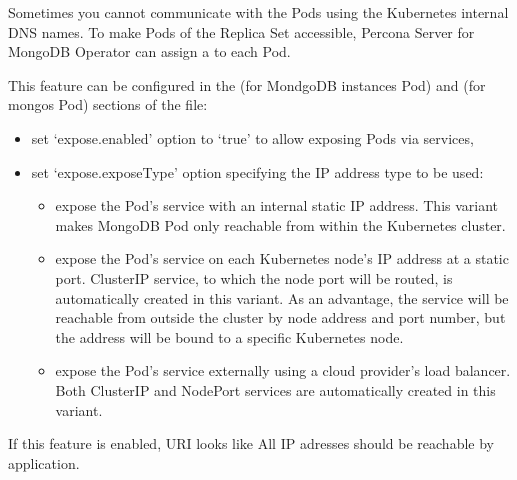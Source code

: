 \documentclass[letterpaper,10pt,english]{sphinxmanual}
\begin{document}
Sometimes you cannot communicate with the Pods using the Kubernetes internal DNS
names. To make Pods of the Replica Set accessible, Percona Server for
MongoDB Operator can assign a 
to each Pod.

This feature can be configured in the  (for MondgoDB instances Pod)
and  (for mongos Pod) sections of the
file:
\begin{itemize}
\item {} 
set ‘expose.enabled’ option to ‘true’ to allow exposing Pods via
services,

\item {} 
set ‘expose.exposeType’ option specifying the IP address type to be
used:
\begin{itemize}
\item {} 
 \sphinxhyphen{} expose the Pod’s service with an internal static
IP address. This variant makes MongoDB Pod only reachable from
within the Kubernetes cluster.

\item {} 
 \sphinxhyphen{} expose the Pod’s service on each Kubernetes node’s
IP address at a static port. ClusterIP service, to which the node
port will be routed, is automatically created in this variant. As
an advantage, the service will be reachable from outside the
cluster by node address and port number, but the address will be
bound to a specific Kubernetes node.

\item {} 
 \sphinxhyphen{} expose the Pod’s service externally using a
cloud provider’s load balancer. Both ClusterIP and NodePort
services are automatically created in this variant.

\end{itemize}

\end{itemize}

If this feature is enabled, URI looks like
All IP adresses should be  reachable by application.
\end{document}
